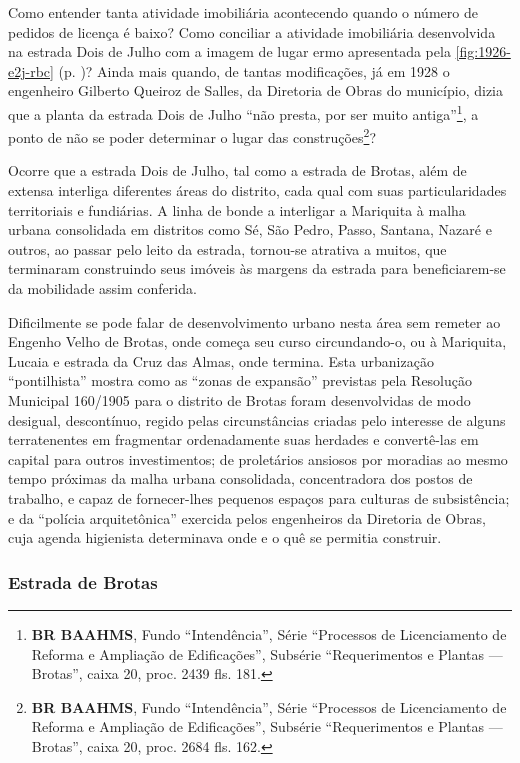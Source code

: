
Como entender tanta atividade imobiliária acontecendo quando o número de pedidos de licença é baixo? Como conciliar a atividade imobiliária desenvolvida na estrada Dois de Julho com a imagem de lugar ermo apresentada pela \autoref{fig:1926-e2j-rbc} (p. \pageref{fig:1926-e2j-rbc})? Ainda mais quando, de tantas modificações, já em 1928 o engenheiro Gilberto Queiroz de Salles, da Diretoria de Obras do município, dizia que a planta da estrada Dois de Julho ``não presta, por ser muito antiga''\footnote{\textbf{BR BAAHMS}, Fundo ``Intendência'', Série ``Processos de Licenciamento de Reforma e Ampliação de Edificações'', Subsérie ``Requerimentos e Plantas --- Brotas'', caixa 20, proc. 2439 fls. 181.}, a ponto de não se poder determinar o lugar das construções\footnote{\textbf{BR BAAHMS}, Fundo ``Intendência'', Série ``Processos de Licenciamento de Reforma e Ampliação de Edificações'', Subsérie ``Requerimentos e Plantas --- Brotas'', caixa 20, proc. 2684 fls. 162.}?

Ocorre que a estrada Dois de Julho, tal como a estrada de Brotas, além de extensa interliga diferentes áreas do distrito, cada qual com suas particularidades territoriais e fundiárias. A linha de bonde a interligar a Mariquita à malha urbana consolidada em distritos como Sé, São Pedro, Passo, Santana, Nazaré e outros, ao passar pelo leito da estrada, tornou-se atrativa a muitos, que terminaram construindo seus imóveis às margens da estrada para beneficiarem-se da mobilidade assim conferida.

Dificilmente se pode falar de desenvolvimento urbano nesta área sem remeter ao Engenho Velho de Brotas, onde começa seu curso circundando-o, ou à Mariquita, Lucaia e estrada da Cruz das Almas, onde termina. Esta urbanização ``pontilhista'' mostra como as ``zonas de expansão'' previstas pela Resolução Municipal 160/1905 para o distrito de Brotas foram desenvolvidas de modo desigual, descontínuo, regido pelas circunstâncias criadas pelo interesse de alguns terratenentes em fragmentar ordenadamente suas herdades e convertê-las em capital para outros investimentos; de proletários ansiosos por moradias ao mesmo tempo próximas da malha urbana consolidada, concentradora dos postos de trabalho, e capaz de fornecer-lhes pequenos espaços para culturas de subsistência; e da ``polícia arquitetônica'' exercida pelos engenheiros da Diretoria de Obras, cuja agenda higienista determinava onde e o quê se permitia construir.

\subsubsection{Estrada de Brotas}\label{subsubsec:estbrotas}

